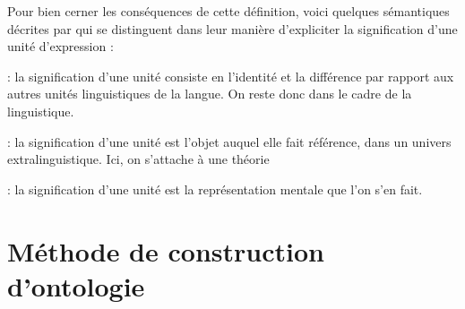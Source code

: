 Pour bien cerner les conséquences de cette définition, voici quelques sémantiques décrites par \cite{bachimont:hdr} qui se distinguent dans leur manière d'expliciter la signification d'une unité d'expression : 
\begin{liste}
	\item {} : la signification d'une unité consiste en l'identité et la différence par rapport aux autres unités linguistiques de la langue. On reste donc dans le cadre de la linguistique.
	\item {} : la signification d'une unité est l'objet auquel elle fait référence, dans un univers extralinguistique. Ici, on s'attache à une théorie %
	\item {} : la signification d'une unité est la représentation mentale que l'on s'en fait. 
\end{liste}






\section{Méthode de construction d'ontologie}\label{chap:construction}